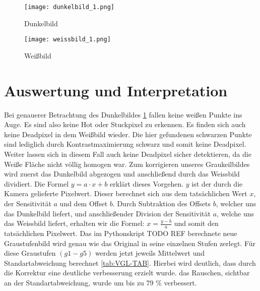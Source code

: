 \begin{figure}[H]
\centering
\texttt{[image: dunkelbild\_1.png]}
\caption{Dunkelbild}
\label{img:Dunkelbild_normal}
\end{figure}


\begin{figure}[H]
\centering
\texttt{[image: weissbild\_1.png]}
\caption{Weißbild}
\label{img:Weissbild_normal}
\end{figure}

\label{chap:VERSUCH_4_MESSWERTE}

\section{Auswertung und Interpretation}
Bei genauerer Betrachtung des Dunkelbildes \ref{img:Dunkelbild_normal} fallen keine weißen Punkte ins Auge. Es sind also keine Hot oder Stuckpixel zu erkennen. Es finden sich auch keine Deadpixel in dem Weißbild wieder. Die hier gefundenen schwarzen Punkte sind lediglich durch Kontrastmaximierung schwarz und somit keine Deadpixel. Weiter lassen sich in diesem Fall auch keine Deadpixel sicher detektieren, da die Weiße Fläche nicht völlig homogen war.
Zum korrigieren unseres Graukeilbildes wird zuerst das Dunkelbild abgezogen und anschließend durch das Weissbild dividiert. Die Formel $y = a\cdot x+b$ erklärt dieses Vorgehen. $y$ ist der durch die Kamera gelieferte Pixelwert. Dieser berechnet sich aus dem tatsächlichen Wert $x$, der Sensitivität $a$ und dem Offset $b$. Durch Subtraktion des Offsets $b$, welcher uns das Dunkelbild liefert, und anschließender Division der Sensitivität $a$, welche uns das Weissbild liefert, erhalten wir die Formel: $x = \frac{y-b}{a}$ und somit den tatsächlichen Pixelwert.
Das im Pythonskript TODO REF berechnete neue Graustufenbild wird genau wie das Original in seine einzelnen Stufen zerlegt. Für diese Graustufen $(g1 - g5)$ werden jetzt jeweils Mittelwert und Standartabweichung berechnet \ref{tab:VGL-TAB}. Hierbei wird deutlich, dass durch die Korrektur eine deutliche verbesserung erzielt wurde. das Rauschen, sichtbar an der Standartabweichung, wurde um bis zu 79 \% verbessert.

